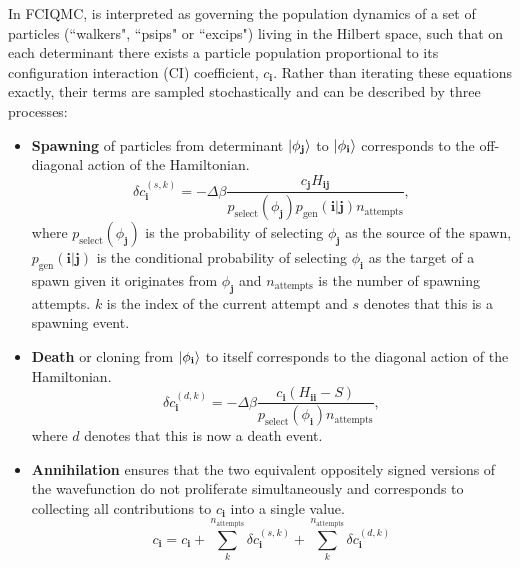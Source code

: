 \documentclass[%
 reprint,
 amsmath,amssymb,
 aps,
]{revtex4-2}
\begin{document}
{In FCIQMC,  is interpreted as governing the population dynamics of a set of particles (``walkers", ``psips" or ``excips") living in the Hilbert space, such that on each determinant there exists a particle population proportional to its configuration interaction (CI) coefficient, $c_\mathbf{i}$. Rather than iterating these equations exactly, their terms are sampled stochastically and can be described by three processes:\cite{Booth2009}
\begin{itemize}
\item \textbf{Spawning} of particles from determinant $\ket{\phi_\mathbf{j}}$ to  $\ket{\phi_\mathbf{i}}$ corresponds to the off-diagonal action of the Hamiltonian.
\begin{equation} 
\delta c_\mathbf{i}^{(s, k)} = - \Delta\beta \frac{c_\mathbf{j}H_\mathbf{ij}}{p_\mathrm{select}(\phi_\mathbf{j}) p_\mathrm{gen}(\mathbf{i}|\mathbf{j}) n_\mathrm{attempts}},
\label{eq:pspawn}
\end{equation}
where $p_\mathrm{select}(\phi_\mathbf{j})$ is the probability of selecting $\phi_\mathbf{j}$ as the source of the spawn, $p_\mathrm{gen}(\mathbf{i}|\mathbf{j})$ is the conditional probability of selecting $\phi_\mathbf{i}$ as the target of a spawn given it originates from $\phi_\mathbf{j}$ and $n_\mathrm{attempts}$ is the number of spawning attempts. $k$ is the index of the current attempt and $s$ denotes that this is a spawning event.
\item \textbf{Death} or cloning from $\ket{\phi_\mathbf{i}}$ to itself corresponds to the diagonal action of the Hamiltonian.
\begin{equation} 
\delta c_\mathbf{i}^{(d, k)} = - \Delta\beta \frac{c_\mathbf{i} (H_\mathbf{ii} - S)}{p_\mathrm{select}(\phi_\mathbf{i}) n_\mathrm{attempts}},
\end{equation}
where $d$ denotes that this is now a death event.
\item \textbf{Annihilation} ensures that the two equivalent oppositely signed versions of the wavefunction do not proliferate simultaneously and corresponds to collecting all contributions to $c_\mathbf{i}$ into a single value.
\begin{equation}
c_\mathbf{i} = c_\mathbf{i} + \sum_k^{n_\mathrm{attempts}}\delta c_\mathbf{i}^{(s, k)} + \sum_k^{n_\mathrm{attempts}}\delta c_\mathbf{i}^{(d, k)}
\end{equation}
\end{itemize}}
\end{document}
